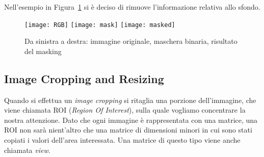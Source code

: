 Nell'esempio in Figura~\ref{fig:mask_example} si è deciso di rimuove l'informazione relativa allo sfondo.
\begin{figure}[ht] %
  \begin{center}
    \texttt{[image: RGB]}
    \texttt{[image: mask]}
    \texttt{[image: masked]}
    \caption{Da sinistra a destra: immagine originale, maschera binaria, risultato del masking}
    \label{fig:mask_example}
  \end{center}
\end{figure}


% 
% 
% 
% 

\clearpage
\subsection {Image Cropping and Resizing}
Quando si effettua un \textit{image cropping} si ritaglia una porzione dell'immagine, che viene chiamata ROI (\textit{Region Of Interest}), sulla quale vogliamo concentrare la nostra attenzione.
Dato che ogni immagine è rappresentata con una matrice, una ROI non sarà nient'altro che una matrice di dimensioni minori in cui sono stati copiati i valori dell'area interessata.
Una matrice di questo tipo viene anche chiamata \textit{view}.

